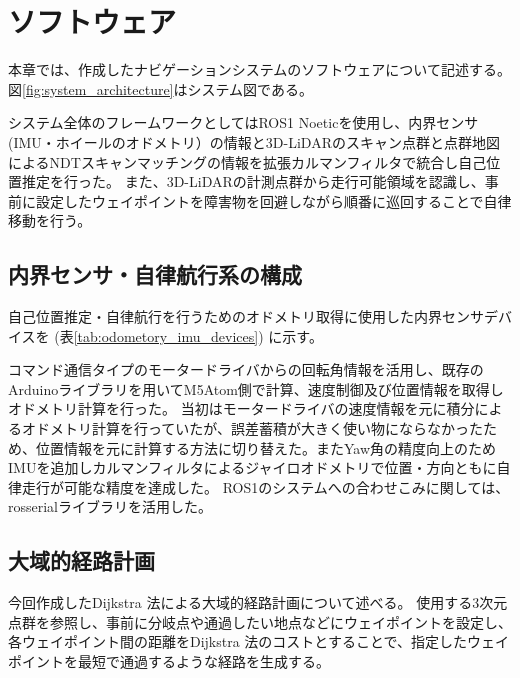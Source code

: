 \documentclass[platex,dvipdfmx]{rbproceedings}
\begin{document}
\section{ソフトウェア}
本章では、作成したナビゲーションシステムのソフトウェアについて記述する。
図\ref{fig:system_architecture}はシステム図である。

システム全体のフレームワークとしてはROS1 Noetic\cite{ros}を使用し、内界センサ(IMU・ホイールのオドメトリ）の情報と3D-LiDARのスキャン点群と点群地図によるNDT\cite{NDT}スキャンマッチングの情報を拡張カルマンフィルタで統合し自己位置推定を行った。
また、3D-LiDARの計測点群から走行可能領域を認識し、事前に設定したウェイポイントを障害物を回避しながら順番に巡回することで自律移動を行う。

\subsection{内界センサ・自律航行系の構成}
自己位置推定・自律航行を行うためのオドメトリ取得に使用した内界センサデバイスを (表\ref{tab:odometory_imu_devices}) に示す。
\begin{table}
\centering
\caption{内界センサとして使用したデバイス}
\label{tab:odometory_imu_devices}
\end{table}

コマンド通信タイプのモータードライバからの回転角情報を活用し、既存のArduinoライブラリ\cite{ddt_motor}を用いてM5Atom側で計算、速度制御及び位置情報を取得しオドメトリ計算を行った。
当初はモータードライバの速度情報を元に積分によるオドメトリ計算を行っていたが、誤差蓄積が大きく使い物にならなかったため、位置情報を元に計算する方法に切り替えた。またYaw角の精度向上のためIMUを追加しカルマンフィルタによるジャイロオドメトリで位置・方向ともに自律走行が可能な精度を達成した。
ROS1のシステムへの合わせこみに関しては、rosserialライブラリ\cite{rosserial}を活用した。

\subsection{大域的経路計画}
今回作成したDijkstra 法\cite{dijkstra}による大域的経路計画について述べる。
使用する3次元点群を参照し、事前に分岐点や通過したい地点などにウェイポイントを設定し、
各ウェイポイント間の距離をDijkstra 法のコストとすることで、指定したウェイポイントを最短で通過するような経路を生成する。
\end{document}
